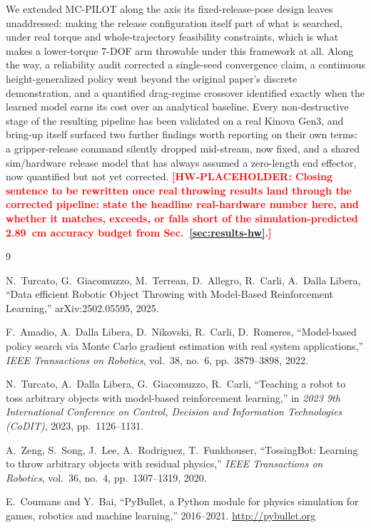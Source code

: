 \documentclass[conference]{IEEEtran}
\newcommand{\hwtodo}[1]{\textcolor{red}{\textbf{[HW-PLACEHOLDER: #1]}}}
\begin{document}
We extended MC-PILOT along the axis its fixed-release-pose design leaves
unaddressed: making the release configuration itself part of what is
searched, under real torque and whole-trajectory feasibility constraints,
which is what makes a lower-torque 7-DOF arm throwable under this framework
at all. Along the way, a reliability audit corrected a single-seed
convergence claim, a continuous height-generalized policy went beyond the
original paper's discrete demonstration, and a quantified drag-regime
crossover identified exactly when the learned model earns its cost over an
analytical baseline. Every non-destructive stage of the resulting pipeline
has been validated on a real Kinova Gen3, and bring-up itself surfaced two
further findings worth reporting on their own terms: a gripper-release
command silently dropped mid-stream, now fixed, and a shared sim/hardware
release model that has always assumed a zero-length end effector, now
quantified but not yet corrected. \hwtodo{Closing sentence to be rewritten
once real throwing results land through the corrected pipeline: state the
headline real-hardware number here, and whether it matches, exceeds, or
falls short of the simulation-predicted 2.89~cm accuracy budget from
Sec.~\ref{sec:results-hw}.}


\begin{thebibliography}{9}

N.~Turcato, G.~Giacomuzzo, M.~Terrean, D.~Allegro, R.~Carli, A.~Dalla
Libera, ``Data efficient Robotic Object Throwing with Model-Based
Reinforcement Learning,'' arXiv:2502.05595, 2025.

F.~Amadio, A.~Dalla Libera, D.~Nikovski, R.~Carli, D.~Romeres,
``Model-based policy search via Monte Carlo gradient estimation with real
system applications,'' \emph{IEEE Transactions on Robotics}, vol.~38,
no.~6, pp.~3879--3898, 2022.

N.~Turcato, A.~Dalla Libera, G.~Giacomuzzo, R.~Carli, ``Teaching a robot to
toss arbitrary objects with model-based reinforcement learning,'' in
\emph{2023 9th International Conference on Control, Decision and
Information Technologies (CoDIT)}, 2023, pp.~1126--1131.

A.~Zeng, S.~Song, J.~Lee, A.~Rodriguez, T.~Funkhouser, ``TossingBot:
Learning to throw arbitrary objects with residual physics,'' \emph{IEEE
Transactions on Robotics}, vol.~36, no.~4, pp.~1307--1319, 2020.

E.~Coumans and Y.~Bai, ``PyBullet, a Python module for physics simulation
for games, robotics and machine learning,'' 2016--2021.
\url{http://pybullet.org}

\end{thebibliography}
\end{document}
